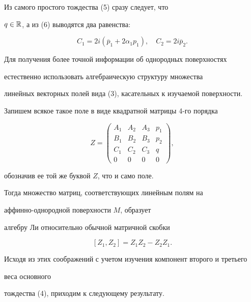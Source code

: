 Из самого простого тождества (5) сразу следует, что


$ q \in \Bbb R $, а из (6) выводятся два равенства: 


$$


 C_1 = 2 i ( \overline p_1 + 2 \alpha_1 p_1), \quad


 C_2 = 2 i \overline p_2. 


$$





Для получения более точной информации об однородных поверхностях 


естественно использовать алгебраическую структуру множества


линейных векторных полей вида (3), касательных к изучаемой поверхности.


Запишем всякое такое поле в виде квадратной матрицы 4-го порядка


$$


Z=


\begin{pmatrix}


A_1 & A_2 & A_3 & p_1 \\


B_1 & B_2 & B_3 & p_2 \\


C_1 & C_2 & C_3 & q \\


0 & 0 & 0 & 0


\end{pmatrix}


,


$$


обозначив ее той же буквой $ Z $, что и само поле.


Тогда множество матриц, соответствующих линейным полям на 


аффинно-однородной поверхности $ M $, образует 


алгебру Ли относительно обычной матричной скобки 


$$


 [ Z_1, Z_2 ] = Z_1 Z_2 - Z_2 Z_1. 


$$





Исходя из этих соображений с учетом изучения компонент второго и третьего


веса основного


тождества (4), приходим к следующему результату.








